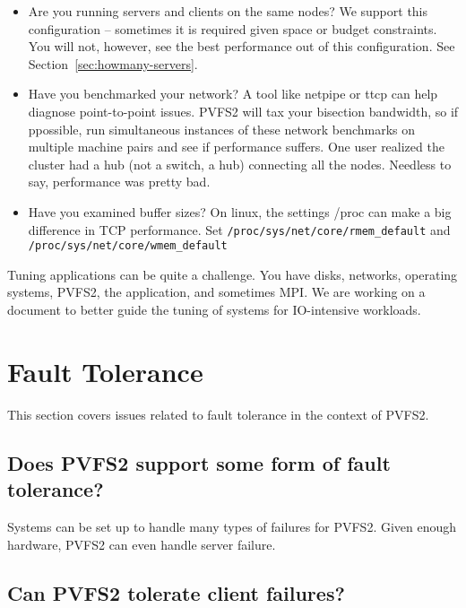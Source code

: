 \documentclass[11pt,letterpaper]{article}
\begin{document}
\begin{itemize}

\item Are you running servers and clients on the same nodes?  We support this
      configuration -- sometimes it is required given space or budget
      constraints.  You will not, however, see the best performance out of this
      configuration.  See Section~\ref{sec:howmany-servers}. 

\item Have you benchmarked your network?  A tool like netpipe or ttcp can help
      diagnose point-to-point issues.  PVFS2 will tax your bisection bandwidth,
      so if ppossible, run simultaneous instances of these network benchmarks
      on multiple machine pairs and see if performance suffers.  One user
      realized the cluster had a hub (not a switch, a hub) connecting all the
      nodes.  Needless to say, performance was pretty bad. 

\item Have you examined buffer sizes?  On linux, the settings /proc can make a
      big difference in TCP performance.  Set
      \texttt{/proc/sys/net/core/rmem\_default} and
      \texttt{/proc/sys/net/core/wmem\_default} 

\end{itemize}

Tuning applications can be quite a challenge.  You have disks, networks,
operating systems, PVFS2, the application, and sometimes MPI.  We are
working on a document to better guide the tuning of systems for
IO-intensive workloads.


%
%
\section{Fault Tolerance}
\label{sec:fault-tolerance}

This section covers issues related to fault tolerance in the context of PVFS2.

\subsection{Does PVFS2 support some form of fault tolerance?}

Systems can be set up to handle many types of failures for PVFS2.  Given enough
hardware, PVFS2 can even handle server failure.

\subsection{Can PVFS2 tolerate client failures?}
\end{document}
